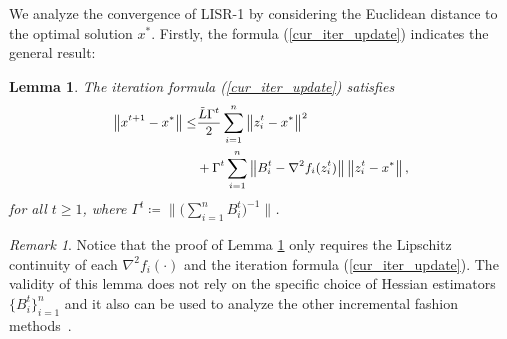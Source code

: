 \documentclass[letterpaper]{article} %
\theoremstyle{plain}
\newtheorem{lemma}[theorem]{Lemma}
\theoremstyle{definition}
\theoremstyle{remark}
\newtheorem{remark}[theorem]{Remark}
\newcommand\norm[1]{\left\lVert#1\right\rVert}
\begin{document}
We analyze the convergence of LISR-1 by considering the Euclidean distance to the optimal solution $x^*$.
Firstly, the formula (\ref{cur_iter_update}) indicates the general result:

\begin{lemma}\label{lemma:cur_iter_bound}
    The iteration formula (\ref{cur_iter_update}) satisfies
    \begin{equation}
    \small
    \begin{split}
        \norm{x^{t+1} - x^*} \leq& \frac{\Tilde{L} \Gamma^{t}}{2} \sum_{i=1}^n \norm{z_i^{t} - x^*}^2  \\
        & + \Gamma^{t} \sum_{i=1}^n \norm{B_{i}^{t} - \nabla^2 f_i (z_i^{t})} \norm{z_i^{t} - x^*},
    \end{split}
    \end{equation}
    for all $t \geq 1$, where $\Gamma^t \coloneqq \big\|\big(\sum_{i=1}^n B_i^t\big)^{-1}\big\|$. 
\end{lemma}
\begin{remark}
Notice that the proof of Lemma \ref{lemma:cur_iter_bound} only requires the Lipschitz continuity of each $\nabla^2 f_i(\cdot)$ and the iteration formula (\ref{cur_iter_update}).
The validity of this lemma does not rely on the specific choice of Hessian estimators $\{B_i^t\}_{i=1}^n$ and it also can be used to analyze the other incremental fashion methods~\cite{mokhtari2018iqn,lahoti2023sharpened,gao2020incremental}.
\end{remark}
\end{document}
